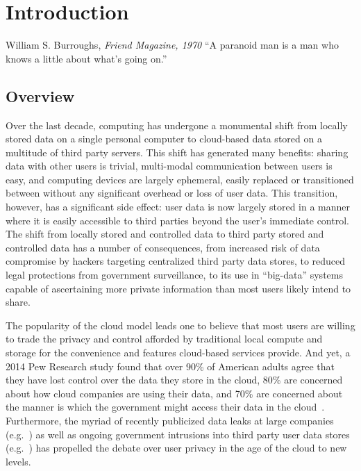 \chapter{Introduction}
\label{chap:intro}

\begin{chapquote}{William S. Burroughs, \textit{Friend Magazine, 1970}}
  ``A paranoid man is a man who knows a little about what's going on.''
\end{chapquote}

\section{Overview}
\label{chap:intro:overview}

Over the last decade, computing has undergone a monumental shift from
locally stored data on a single personal computer to cloud-based data
stored on a multitude of third party servers. This shift has generated
many benefits: sharing data with other users is trivial, multi-modal
communication between users is easy, and computing devices are largely
ephemeral, easily replaced or transitioned between without any
significant overhead or loss of user data. This transition, however,
has a significant side effect: user data is now largely stored in a
manner where it is easily accessible to third parties beyond the
user's immediate control. The shift from locally stored and controlled
data to third party stored and controlled data has a number of
consequences, from increased risk of data compromise by hackers
targeting centralized third party data stores, to reduced legal
protections from government surveillance, to its use in ``big-data''
systems capable of ascertaining more private information than most
users likely intend to share.

The popularity of the cloud model leads one to believe that most users
are willing to trade the privacy and control afforded by traditional
local compute and storage for the convenience and features cloud-based
services provide. And yet, a 2014 Pew Research study found that over
90\% of American adults agree that they have lost control over the
data they store in the cloud, 80\% are concerned about how cloud
companies are using their data, and 70\% are concerned about the
manner is which the government might access their data in the
cloud~\cite{pew-privsec14}. Furthermore, the myriad of recently
publicized data leaks at large companies
(e.g.~\cite{apple-icloudleak}) as well as ongoing government
intrusions into third party user data stores
(e.g.~\cite{greenwald-prism}) has propelled the debate over user
privacy in the age of the cloud to new levels.

